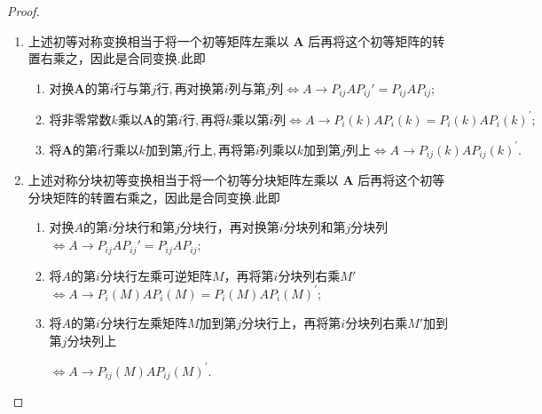 \documentclass[../../main.tex]{subfiles}%
\begin{document}
\begin{proof}
\begin{enumerate}
\item 上述初等对称变换相当于将一个初等矩阵左乘以 $\boldsymbol{A}$ 后再将这个初等矩阵的转置右乘之，因此是合同变换.此即
\begin{enumerate}[(1)]
\item $\text{对换}\boldsymbol{A}\text{的第}i\text{行与第}j\text{行},\text{再对换第}i\text{列与第}j\text{列} \iff A\rightarrow P_{ij}AP_{ij}'=P_{ij}AP_{ij};$

\item $\text{将非零常数}k\text{乘以}\boldsymbol{A}\text{的第}i\text{行},\text{再将}k\text{乘以第}i\text{列}\Longleftrightarrow A\rightarrow P_i\left( k \right) AP_{i}\left( k \right)= P_i\left( k \right) AP_{i}\left( k \right)^{\prime};$

\item $\text{将}\boldsymbol{A}\text{的第}i\text{行乘以}k\text{加到第}j\text{行上},\text{再将第}i\text{列乘以}k\text{加到第}j\text{列上}\Longleftrightarrow A\rightarrow P_{ij}\left( k \right) AP_{ij}\left( k \right)^{\prime} .$
\end{enumerate}

\item 上述对称分块初等变换相当于将一个初等分块矩阵左乘以 $\boldsymbol{A}$ 后再将这个初等分块矩阵的转置右乘之，因此是合同变换.此即
\begin{enumerate}[(1)]
\item 对换\(A\)的第\(i\)分块行和第\(j\)分块行，再对换第\(i\)分块列和第\(j\)分块列$\iff A\rightarrow P_{ij}AP_{ij}'=P_{ij}AP_{ij};$

\item 将\(A\)的第\(i\)分块行左乘可逆矩阵\(M\)，再将第\(i\)分块列右乘\(M'\)$\Longleftrightarrow A\rightarrow P_i\left( M \right) AP_{i}\left( M \right)= P_i\left( M \right) AP_{i}\left( M \right)^{\prime};$

\item 将\(A\)的第\(i\)分块行左乘矩阵\(M\)加到第\(j\)分块行上，再将第\(i\)分块列右乘\(M'\)加到第\(j\)分块列上

$\Longleftrightarrow A\rightarrow P_{ij}\left( M \right) AP_{ij}\left( M \right)^{\prime} .$
\end{enumerate}
\end{enumerate}
\end{proof}
\end{document}
